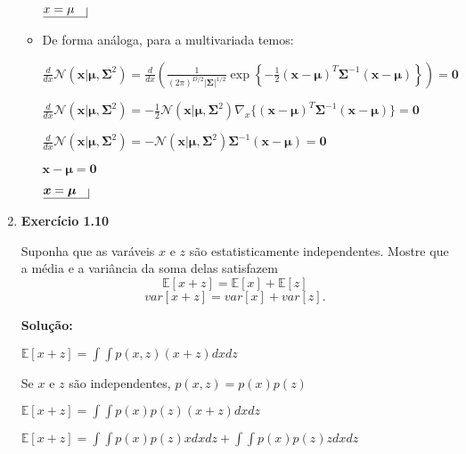 \begin{enumerate}
\begin{itemize}
        $\underline{x=\mu \quad} \vline$
       

    \item De forma análoga, para a multivariada temos:
    

        $\frac{d}{dx} \mathcal{N}(\boldsymbol{x} | \boldsymbol{\mu}, \boldsymbol{\Sigma}^2) = \frac{d}{dx} \left( \frac{1}{(2\pi)^{D/2}|\boldsymbol{\Sigma}|^{1/2}}\exp\left\{ -\frac{1}{2}(\boldsymbol{x} - \boldsymbol{\mu})^T \boldsymbol{\Sigma}^{-1}(\boldsymbol{x} - \boldsymbol{\mu})  \right\} \right) = \boldsymbol{0}$
        
        $\frac{d}{dx} \mathcal{N}(\boldsymbol{x} | \boldsymbol{\mu}, \boldsymbol{\Sigma}^2) = 
        -\frac{1}{2} \mathcal{N}(\boldsymbol{x} | \boldsymbol{\mu}, \boldsymbol{\Sigma}^2) \nabla_x \{(\boldsymbol{x}-\boldsymbol{\mu})^T \boldsymbol{\Sigma}^{-1} (\boldsymbol{x}-\boldsymbol{\mu})  \}
         = \boldsymbol{0}$
        
        $\frac{d}{dx} \mathcal{N}(\boldsymbol{x} | \boldsymbol{\mu}, \boldsymbol{\Sigma}^2) = 
        -\mathcal{N}(\boldsymbol{x} | \boldsymbol{\mu}, \boldsymbol{\Sigma}^2) \boldsymbol{\Sigma}^{-1} (\boldsymbol{x}-\boldsymbol{\mu})
         = \boldsymbol{0}$

        $\boldsymbol{x}-\boldsymbol{\mu} = \boldsymbol{0}$

        $\underline{\boldsymbol{x}=\boldsymbol{\mu} \quad} \vline$
\end{itemize}

\item \textbf{Exercício 1.10} \par

Suponha que as varáveis $x$ e $z$ são estatisticamente independentes. Mostre que a média e a variância da soma delas satisfazem
\begin{equation*}
    \mathbb{E}[x+z]=\mathbb{E}[x]+\mathbb{E}[z]
\end{equation*}
\begin{equation*}
    var[x+z]=var[x]+var[z].
\end{equation*}
\newline \par
\textbf{Solução:}

    $ \mathbb{E}[x+z] = \displaystyle \int \int p(x,z) (x+z) dx dz $

    Se $x$ e $z$ são independentes, $p(x,z) = p(x)p(z)$

    $ \mathbb{E}[x+z] = \displaystyle \int \int p(x)p(z) (x+z) dx dz $

    $ \mathbb{E}[x+z] = \displaystyle \int \int p(x)p(z) x dx dz +  \int \int p(x)p(z) z dx dz $


\end{enumerate}
